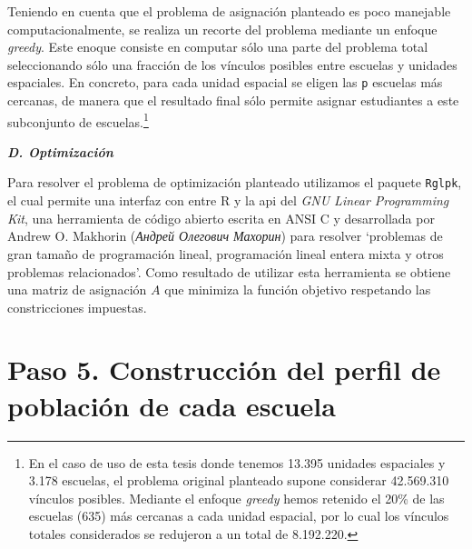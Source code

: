 \documentclass[
  spanish,
  a4paper,%
  chapterprefix=true,%
  DIV=calc,%
  twoside]{scrbook}%
\newcommand{\passthrough}[1]{#1}
\begin{document}
Teniendo en cuenta que el problema de asignación planteado es poco manejable computacionalmente, se realiza un recorte del problema mediante un enfoque \emph{greedy}. Este enoque consiste en computar sólo una parte del problema total seleccionando sólo una fracción de los vínculos posibles entre escuelas y unidades espaciales. En concreto, para cada unidad espacial se eligen las \passthrough{\lstinline!p!} escuelas más cercanas, de manera que el resultado final sólo permite asignar estudiantes a este subconjunto de escuelas.\footnote{En el caso de uso de esta tesis donde tenemos 13.395 unidades espaciales y 3.178 escuelas, el problema original planteado supone considerar 42.569.310 vínculos posibles. Mediante el enfoque \emph{greedy} hemos retenido el 20\% de las escuelas (635) más cercanas a cada unidad espacial, por lo cual los vínculos totales considerados se redujeron a un total de 8.192.220.}

\textbf{\emph{D. Optimización}}

Para resolver el problema de optimización planteado utilizamos el paquete \passthrough{\lstinline!Rglpk!}, el cual permite una interfaz con entre R y la api del \emph{GNU Linear Programming Kit}, una herramienta de código abierto escrita en ANSI C y desarrollada por Andrew O. Makhorin (\emph{Андрей Олегович Махорин}) para resolver `problemas de gran tamaño de programación lineal, programación lineal entera mixta y otros problemas relacionados'. Como resultado de utilizar esta herramienta se obtiene una matriz de asignación \(A\) que minimiza la función objetivo respetando las constricciones impuestas.

\section*{Paso 5. Construcción del perfil de población de cada escuela}\label{paso-5.-construcciuxf3n-del-perfil-de-poblaciuxf3n-de-cada-escuela}
\end{document}
